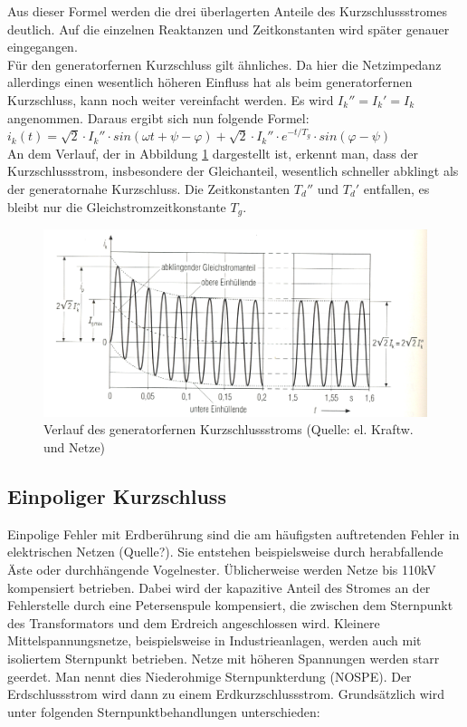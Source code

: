 \documentclass{scrartcl}
\begin{document}
\begin{onehalfspace}
Aus dieser Formel werden die drei überlagerten Anteile des Kurzschlussstromes deutlich. Auf die einzelnen Reaktanzen und Zeitkonstanten wird später genauer eingegangen. \\

Für den generatorfernen Kurzschluss gilt ähnliches. Da hier die Netzimpedanz allerdings einen wesentlich höheren Einfluss hat als beim generatorfernen Kurzschluss, kann noch weiter vereinfacht werden. Es wird $I_k'' = I_k' = I_k$ angenommen. Daraus ergibt sich nun folgende Formel: \\

$i_k(t) = \sqrt{2} \cdot I_k'' \cdot sin(\omega t + \psi - \varphi) + \sqrt{2} \cdot I_k'' \cdot e^{-t/T_g} \cdot sin(\varphi - \psi) $ \\

An dem Verlauf, der in Abbildung \ref{kss-verlauf-fern} dargestellt ist, erkennt man, dass der Kurzschlussstrom, insbesondere der Gleichanteil, wesentlich schneller abklingt als der generatornahe Kurzschluss. Die Zeitkonstanten $T_d''$ und $T_d'$ entfallen, es bleibt nur die Gleichstromzeitkonstante $T_g$.

	\begin{figure}[H]
	\centering
	\includegraphics[scale=1]{img/kurzschlussstromverlauf-fern.jpg}
	\caption{Verlauf des generatorfernen Kurzschlussstroms (Quelle: el. Kraftw. und Netze)}
	\label{kss-verlauf-fern}
	\end{figure}
	
\subsection{Einpoliger Kurzschluss}
Einpolige Fehler mit Erdberührung sind die am häufigsten auftretenden Fehler in elektrischen Netzen (Quelle?). Sie entstehen beispielsweise durch herabfallende Äste oder durchhängende Vogelnester. Üblicherweise werden Netze bis 110kV kompensiert betrieben. Dabei wird der kapazitive Anteil des Stromes an der Fehlerstelle durch eine Petersenspule kompensiert, die zwischen dem Sternpunkt des Transformators und dem Erdreich angeschlossen wird. Kleinere Mittelspannungsnetze, beispielsweise in Industrieanlagen, werden auch mit isoliertem Sternpunkt betrieben. Netze mit höheren Spannungen werden starr geerdet. Man nennt dies \glqq Niederohmige Sternpunkterdung\grqq{} (NOSPE). Der Erdschlussstrom wird dann zu einem Erdkurzschlussstrom. Grundsätzlich wird unter folgenden Sternpunktbehandlungen unterschieden:


\end{onehalfspace}
\end{document}
